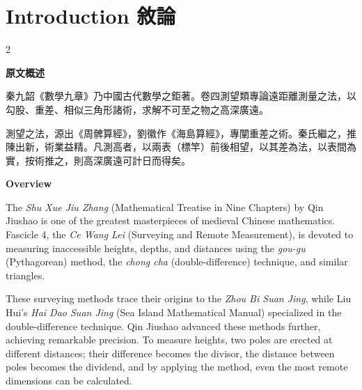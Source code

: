 \documentclass[11pt,a4paper]{article}
\begin{document}
\tableofcontents
\newpage

\section*{Introduction 敘論}
\label{sec:intro}

\begin{paracol}{2}

\switchcolumn[0]
\noindent\textbf{\color{sectioncolor}原文概述}

秦九韶《數學九章》乃中國古代數學之鉅著。卷四測望類專論遠距離測量之法，以勾股、重差、相似三角形諸術，求解不可至之物之高深廣遠。

測望之法，源出《周髀算經》，劉徽作《海島算經》，專闡重差之術。秦氏繼之，推陳出新，術業益精。凡測高者，以兩表（標竿）前後相望，以其差為法，以表間為實，按術推之，則高深廣遠可計日而得矣。

\switchcolumn[1]
\noindent\textbf{\color{sectioncolor}Overview}

The \textit{Shu Xue Jiu Zhang} (Mathematical Treatise in Nine Chapters) by Qin Jiushao is one of the greatest masterpieces of medieval Chinese mathematics. Fascicle 4, the \textit{Ce Wang Lei} (Surveying and Remote Measurement), is devoted to measuring inaccessible heights, depths, and distances using the \textit{gou-gu} (Pythagorean) method, the \textit{chong cha} (double-difference) technique, and similar triangles.

These surveying methods trace their origins to the \textit{Zhou Bi Suan Jing}, while Liu Hui's \textit{Hai Dao Suan Jing} (Sea Island Mathematical Manual) specialized in the double-difference technique. Qin Jiushao advanced these methods further, achieving remarkable precision. To measure heights, two poles are erected at different distances; their difference becomes the divisor, the distance between poles becomes the dividend, and by applying the method, even the most remote dimensions can be calculated.

\end{paracol}

\vspace{1em}
\end{document}
